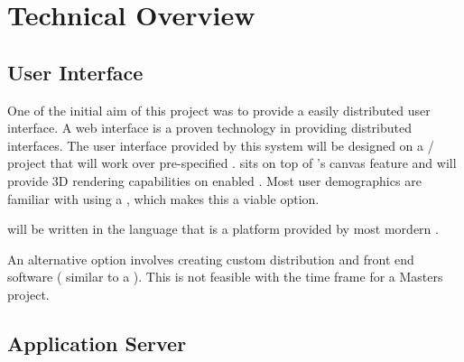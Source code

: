 \documentclass[11pt]{report}
\begin{document}
\section{Technical Overview}

\subsection{User Interface}




One of the initial aim of this project was to provide a easily distributed user interface. A web interface is a proven technology in providing distributed interfaces. The user interface provided by this system will be designed on a / project that will work over pre-specified .  sits on top of 's canvas feature and will provide 3D rendering capabilities on enabled . Most user demographics are familiar with using a , which makes this a viable option. 

 will be written in the  language that is a platform provided by most mordern . 

An alternative option involves creating custom distribution and front end software ( similar to a  ). This is not feasible with the time frame for a Masters project. 

\subsection{Application Server}

\end{document}
